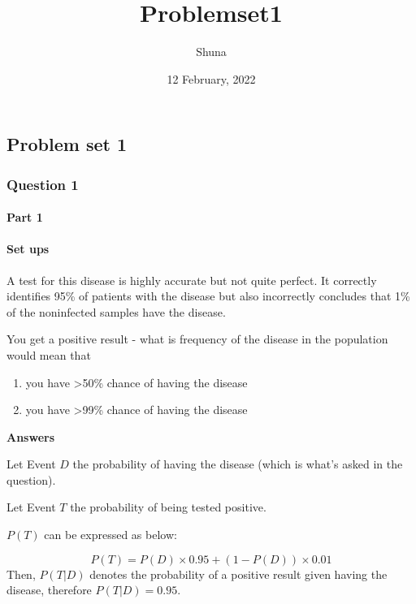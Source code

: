 \documentclass[
]{article}
\title{Problemset1}
\author{Shuna}
\date{12 February, 2022}
\providecommand{\tightlist}{%
  \setlength{\itemsep}{0pt}\setlength{\parskip}{0pt}}
\begin{document}
\maketitle

{
\setcounter{tocdepth}{2}
\tableofcontents
}
\hypertarget{problem-set-1}{%
\subsection{Problem set 1}\label{problem-set-1}}

\hypertarget{question-1}{%
\subsubsection{Question 1}\label{question-1}}

\hypertarget{part-1}{%
\paragraph{Part 1}\label{part-1}}

\hypertarget{set-ups}{%
\paragraph{Set ups}\label{set-ups}}

A test for this disease is highly accurate but not quite perfect. It
correctly identifies 95\% of patients with the disease but also
incorrectly concludes that 1\% of the noninfected samples have the
disease.

You get a positive result - what is frequency of the disease in the
population would mean that

\begin{enumerate}
\def\labelenumi{\alph{enumi})}
\tightlist
\item
  you have \textgreater50\% chance of having the disease
\item
  you have \textgreater99\% chance of having the disease
\end{enumerate}

\textbf{Answers}

Let Event \(D\) the probability of having the disease (which is what's
asked in the question).

Let Event \(T\) the probability of being tested positive.

\(P(T)\) can be expressed as below:

\[
P(T) = P(D) \times 0.95 + \left(1-P(D)\right)\times 0.01
\] Then, \(P(T|D)\) denotes the probability of a positive result given
having the disease, therefore \(P(T|D) = 0.95\).
\end{document}
